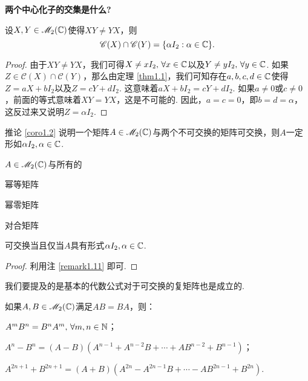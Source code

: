   \begin{mybox}
    \begin{corollary}
      {\bfseries 两个中心化子的交集是什么?}

      设$X,Y\in\mathscr M_2(\mathbb C)$使得$XY\ne YX$，则
      \[
        \mathscr C(X) \cap \mathscr C(Y) =
        \{\alpha I_2:\alpha\in\mathbb C\}.
      \]
    \end{corollary}
  \end{mybox}
  \begin{proof}
    由于$XY\ne YX$，我们可得$X\ne xI_2,\,\forall x\in \mathbb C$以及$Y\ne yI_2,\,\forall y\in\mathbb C$. 如果$Z\in\mathscr C(X)\cap\mathscr C(Y)$，那么由定理 \ref{thm1.1}，我们可知存在$a,b,c,d\in\mathbb C$使得$Z=aX+bI_2$以及$Z=cY+dI_2$. 这意味着$aX+bI_2=cY+dI_2$. 如果$a\ne0$或$c\ne0$，前面的等式意味着$XY=YX$，这是不可能的. 因此，$a=c=0$，即$b=d=\alpha$，这反过来又说明$Z=\alpha I_2$.
  \end{proof}

  \begin{remark}
    推论 \ref{coro1.2} 说明一个矩阵$A\in\mathscr M_2(\mathbb C)$与两个不可交换的矩阵可交换，则$A$一定形如$\alpha I_2,\alpha\in\mathbb C$.
  \end{remark}

  \begin{corollary}
    $A\in\mathscr M_2(\mathbb C)$与所有的
    \begin{enum}
      \item 幂等矩阵
      \item 幂零矩阵
      \item 对合矩阵
    \end{enum}
    可交换当且仅当$A$具有形式$\alpha I_2,\alpha\in\mathbb C$.
  \end{corollary}
  \begin{proof}
    利用注 \ref{remark1.11} 即可.
  \end{proof}

  我们要提及的是基本的代数公式对于可交换的复矩阵也是成立的.
  \begin{property}
    如果$A,B\in\mathscr M_2(\mathbb C)$满足$AB=BA$，则：
    \begin{enum}
      \item $A^mB^n=B^nA^m,\,\forall m,n\in\mathbb N$；
      \item $A^n-B^n=(A-B)(A^{n-1}+A^{n-2}B+\cdots+AB^{n-2}
          +B^{n-1})$；
      \item $A^{2n+1}+B^{2n+1}=(A+B)(A^{2n}-A^{2n-1}B
          +\cdots-AB^{2n-1}+B^{2n})$.
    \end{enum}
  \end{property}

